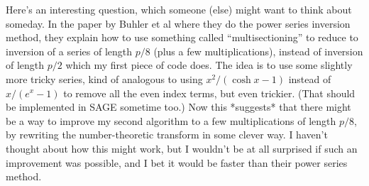 \documentclass{article}
\begin{document}
Here's an interesting question, which someone (else) might want to think about someday. In the paper by Buhler et al where they do the power series inversion method, they explain how to use something called ``multisectioning'' to reduce to inversion of a series of length $p/8$ (plus a few multiplications), instead of inversion of length $p/2$ which my first piece of code does. The idea is to use some slightly more tricky series, kind of analogous to using $x^2/(\cosh x - 1)$ instead of $x/(e^x - 1)$ to remove all the even index terms, but even trickier. (That should be implemented in SAGE sometime too.) Now this *suggests* that there might be a way to improve my second algorithm to a few multiplications of length $p/8$, by rewriting the number-theoretic transform in some clever way. I haven't thought about how this might work, but I wouldn't be at all surprised if such an improvement was possible, and I bet it would be faster than their power series method.
\end{document}
